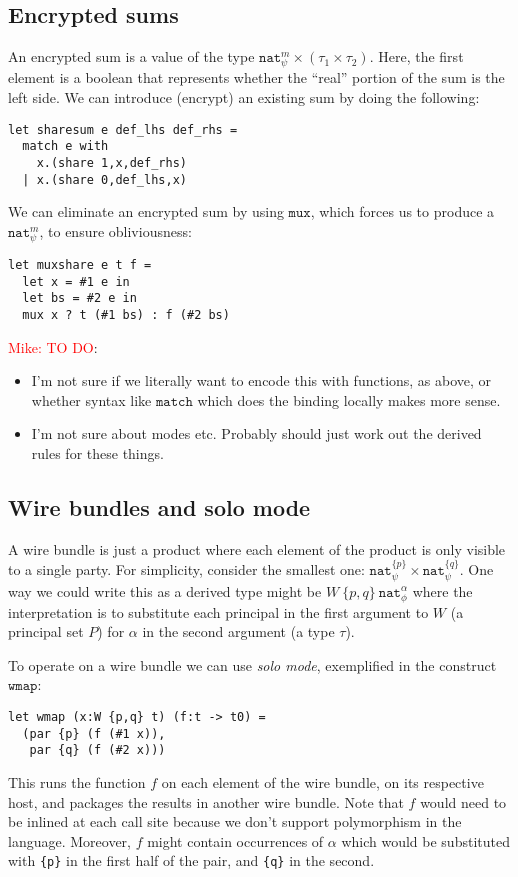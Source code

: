 \documentclass[10pt]{article}
\newcommand{\kw}[1]{\ensuremath{\mathtt{#1}}}
\newcommand{\tnat}{\ensuremath{\mathtt{nat}}}
\newcommand{\tprod}[2]{\ensuremath{{#1} \times {#2}}}
\newcommand{\mwh}[1]{\textcolor{red}{Mike: #1}}
\begin{document}
\subsection{Encrypted sums}

An encrypted sum is a value of the type
$\tprod{\tnat^m_\psi}{(\tprod{\tau_1}{\tau_2})}$. Here, the first
element is a boolean that represents whether the ``real'' portion of
the sum is the left side. We can introduce (encrypt) an existing sum
by doing the following:
\begin{verbatim}
let sharesum e def_lhs def_rhs =
  match e with
    x.(share 1,x,def_rhs)
  | x.(share 0,def_lhs,x)
\end{verbatim}
We can eliminate an encrypted sum by using $\kw{mux}$, which forces us
to produce a $\tnat^m_\psi$, to ensure obliviousness:
\begin{verbatim}
let muxshare e t f =
  let x = #1 e in
  let bs = #2 e in
  mux x ? t (#1 bs) : f (#2 bs)
\end{verbatim}

\mwh{TO DO}:
\begin{itemize}
\item I'm not sure if we literally want to encode this with functions,
  as above, or whether syntax like $\kw{match}$ which does the binding
  locally makes more sense.
\item I'm not sure about modes etc. Probably should just work out the
  derived rules for these things.
\end{itemize}
  
\subsection{Wire bundles and solo mode}

A wire bundle is just a product where each element of the product is
only visible to a single party. For simplicity, consider the smallest
one: $\tprod{\tnat^{\{p\}}_\psi}{\tnat^{\{q\}}_\psi}$. One way we
could write this as a derived type might be
$W~\{p,q\}~\tnat^\alpha_\phi$ where the interpretation is to
substitute each principal in the first argument to $W$ (a principal
set $P$) for $\alpha$ in the second argument (a type $\tau$).

To operate on a wire bundle we can use \emph{solo mode}, exemplified
in the construct $\kw{wmap}$:
\begin{verbatim}
let wmap (x:W {p,q} t) (f:t -> t0) =
  (par {p} (f (#1 x)), 
   par {q} (f (#2 x)))
\end{verbatim}
This runs the function $f$ on each element of the wire bundle, on its
respective host, and packages the results in another wire bundle. Note
that $f$ would need to be inlined at each call site because we don't
support polymorphism in the language. Moreover, $f$ might contain
occurrences of $\alpha$ which would  be substituted with
\texttt{\{p\}} in the first half of the pair, and \texttt{\{q\}} in
the second.
\end{document}
